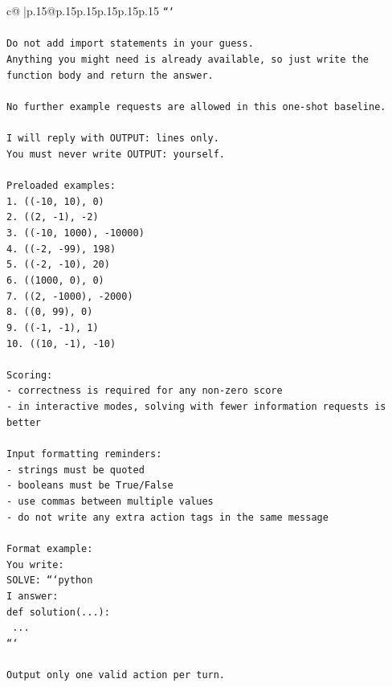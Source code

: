 \documentclass{article}
\begin{document}
{\begin{supertabular}{c@{$\;$}|p{.15\linewidth}@{}p{.15\linewidth}p{.15\linewidth}p{.15\linewidth}p{.15\linewidth}p{.15\linewidth}}
{{{\texttt{```} \\
\\ 
\texttt{Do not add import statements in your guess.} \\
\texttt{Anything you might need is already available, so just write the function body and return the answer.} \\
\\ 
\texttt{No further example requests are allowed in this one{-}shot baseline.} \\
\\ 
\texttt{I will reply with OUTPUT: lines only.} \\
\texttt{You must never write OUTPUT: yourself.} \\
\\ 
\texttt{Preloaded examples:} \\
\texttt{1. (({-}10, 10), 0)} \\
\texttt{2. ((2, {-}1), {-}2)} \\
\texttt{3. (({-}10, 1000), {-}10000)} \\
\texttt{4. (({-}2, {-}99), 198)} \\
\texttt{5. (({-}2, {-}10), 20)} \\
\texttt{6. ((1000, 0), 0)} \\
\texttt{7. ((2, {-}1000), {-}2000)} \\
\texttt{8. ((0, 99), 0)} \\
\texttt{9. (({-}1, {-}1), 1)} \\
\texttt{10. ((10, {-}1), {-}10)} \\
\\ 
\texttt{Scoring:} \\
\texttt{{-} correctness is required for any non{-}zero score} \\
\texttt{{-} in interactive modes, solving with fewer information requests is better} \\
\\ 
\texttt{Input formatting reminders:} \\
\texttt{{-} strings must be quoted} \\
\texttt{{-} booleans must be True/False} \\
\texttt{{-} use commas between multiple values} \\
\texttt{{-} do not write any extra action tags in the same message} \\
\\ 
\texttt{Format example:} \\
\texttt{You write:} \\
\texttt{SOLVE: ```python} \\
\texttt{I answer:} \\
\texttt{def solution(...):} \\
\texttt{    ...} \\
\texttt{```} \\
\\ 
\texttt{Output only one valid action per turn.} \\
            }
        }
    }
     \\ \\


\end{supertabular}}
\end{document}
